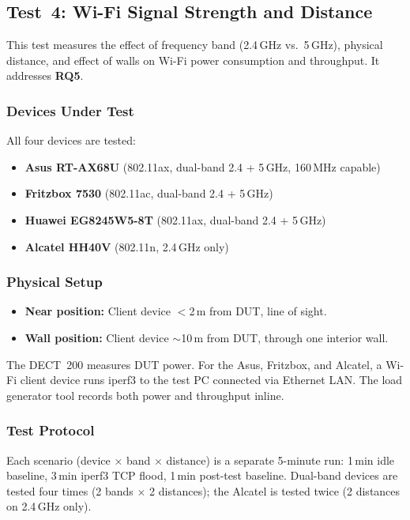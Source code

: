 \subsection{Test~4: Wi-Fi Signal Strength and Distance}
\label{sec:test-wifi-distance}

This test measures the effect of frequency band (2.4\,GHz vs.\ 5\,GHz), physical distance, and effect of walls on Wi-Fi power consumption and throughput. It addresses \textbf{RQ5}.

\subsubsection{Devices Under Test}
All four devices are tested:
\begin{itemize}
    \item \textbf{Asus RT-AX68U} (802.11ax, dual-band 2.4 + 5\,GHz, 160\,MHz capable)
    \item \textbf{Fritzbox 7530} (802.11ac, dual-band 2.4 + 5\,GHz)
    \item \textbf{Huawei EG8245W5-8T} (802.11ax, dual-band 2.4 + 5\,GHz)
    \item \textbf{Alcatel HH40V} (802.11n, 2.4\,GHz only)
\end{itemize}

\subsubsection{Physical Setup}
\begin{itemize}
    \item \textbf{Near position:} Client device $<$2\,m from \ac{DUT}, line of sight.
    \item \textbf{Wall position:} Client device $\sim$10\,m from \ac{DUT}, through one interior wall.
\end{itemize}
The \ac{DECT}~200 measures \ac{DUT} power.
For the Asus, Fritzbox, and Alcatel, a Wi-Fi client device runs iperf3 to the test PC connected via Ethernet \ac{LAN}.
The load generator tool records both power and throughput inline.

\subsubsection{Test Protocol}
Each scenario (device $\times$ band $\times$ distance) is a separate 5-minute run: 1\,min idle baseline, 3\,min iperf3 \ac{TCP} flood, 1\,min post-test baseline.
Dual-band devices are tested four times (2 bands $\times$ 2 distances); the Alcatel is tested twice (2 distances on 2.4\,GHz only).

